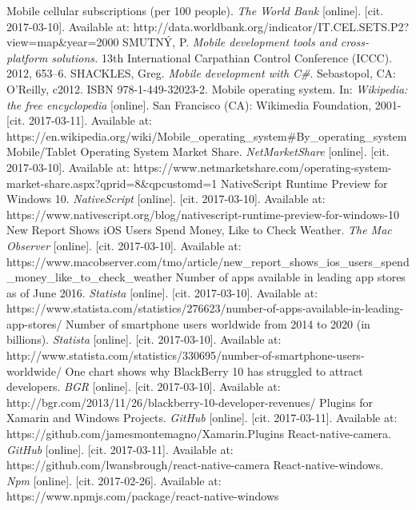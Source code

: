 \documentclass[english,master,public,dept460,male,cpdeclaration,oneside]{diploma}
\begin{document}
\begin{thebibliography}{99}
	 Mobile cellular subscriptions (per 100 people). \textit{The World Bank} [online]. [cit. 2017-03-10]. Available at: http://data.worldbank.org/indicator/IT.CEL.SETS.P2?view=map\&year=2000
	SMUTNÝ, P. \textit{Mobile development tools and cross-platform solutions.} 13th International Carpathian Control Conference (ICCC). 2012, 653–6.
	 SHACKLES, Greg. \textit{Mobile development with C\#}. Sebastopol, CA: O'Reilly, c2012. ISBN 978-1-449-32023-2.
	 Mobile operating system. In: \textit{Wikipedia: the free encyclopedia} [online]. San Francisco (CA): Wikimedia Foundation, 2001- [cit. 2017-03-11]. Available at: https://en.wikipedia.org/wiki/Mobile\_operating\_system\#By\_operating\_system
	 Mobile/Tablet Operating System Market Share. \textit{NetMarketShare} [online]. [cit. 2017-03-10]. Available at: https://www.netmarketshare.com/operating-system-market-share.aspx?qprid=8\&qpcustomd=1
	 NativeScript Runtime Preview for Windows 10. \textit{NativeScript} [online]. [cit. 2017-03-10]. Available at: https://www.nativescript.org/blog/nativescript-runtime-preview-for-windows-10
	 New Report Shows iOS Users Spend Money, Like to Check Weather. \textit{The Mac Observer} [online]. [cit. 2017-03-10]. Available at: https://www.macobserver.com/tmo/article/new\_report\_shows\_ios\_users\_spend\_money\_like\_to\_check\_weather
	 Number of apps available in leading app stores as of June 2016. \textit{Statista} [online]. [cit. 2017-03-10]. Available at: https://www.statista.com/statistics/276623/number-of-apps-available-in-leading-app-stores/
	 Number of smartphone users worldwide from 2014 to 2020 (in billions). \textit{Statista} [online]. [cit. 2017-03-10]. Available at: http://www.statista.com/statistics/330695/number-of-smartphone-users-worldwide/
	 One chart shows why BlackBerry 10 has struggled to attract developers. \textit{BGR} [online]. [cit. 2017-03-10]. Available at: http://bgr.com/2013/11/26/blackberry-10-developer-revenues/
	 Plugins for Xamarin and Windows Projects. \textit{GitHub} [online]. [cit. 2017-03-11]. Available at: https://github.com/jamesmontemagno/Xamarin.Plugins
	 React-native-camera. \textit{GitHub} [online]. [cit. 2017-03-11]. Available at: https://github.com/lwansbrough/react-native-camera
	 React-native-windows. \textit{Npm} [online]. [cit. 2017-02-26]. Available at: https://www.npmjs.com/package/react-native-windows

\end{thebibliography}
\end{document}
